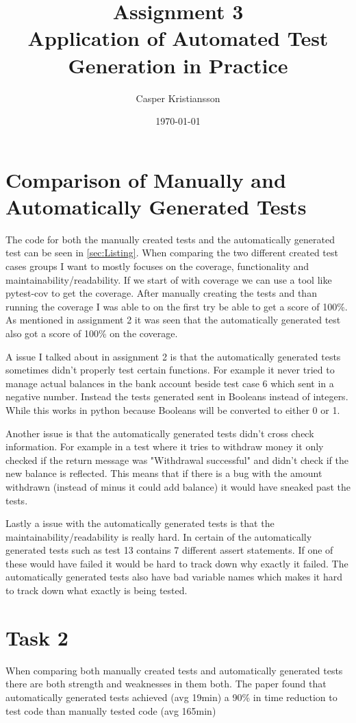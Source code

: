 \documentclass{article}
\title{Assignment 3\\Application of Automated Test Generation in Practice}
\author{Casper Kristiansson}
\date{\today}
\begin{document}
\maketitle

\section{Comparison of Manually and Automatically Generated Tests}
The code for both the manually created tests and the automatically generated test can be seen in \ref{sec:Listing}. When comparing the two different created test cases groups I want to mostly focuses on the coverage, functionality and maintainability/readability. If we start of with coverage we can use a tool like pytest-cov\cite{Welcomet80:online} to get the coverage. After manually creating the tests and than running the coverage I was able to on the first try be able to get a score of 100\%. As mentioned in assignment 2 it was seen that the automatically generated test also got a score of 100\% on the coverage.

A issue I talked about in assignment 2 is that the automatically generated tests sometimes didn't properly test certain functions. For example it never tried to manage actual balances in the bank account beside test case 6 which sent in a negative number. Instead the tests generated sent in Booleans instead of integers. While this works in python because Booleans will be converted to either 0 or 1.

Another issue is that the automatically generated tests didn't cross check information. For example in a test where it tries to withdraw money it only checked if the return message was "Withdrawal successful" and didn't check if the new balance is reflected. This means that if there is a bug with the amount withdrawn (instead of minus it could add balance) it would have sneaked past the tests.

Lastly a issue with the automatically generated tests is that the maintainability/readability is really hard. In certain of the automatically generated tests such as test 13 contains 7 different assert statements. If one of these would have failed it would be hard to track down why exactly it failed. The automatically generated tests also have bad variable names which makes it hard to track down what exactly is being tested.

\section{Task 2}
When comparing both manually created tests and automatically generated tests there are both strength and weaknesses in them both. The paper  \cite{enoiu2017comparative} found that automatically generated tests achieved (avg 19min) a 90\% in time reduction to test code than manually tested code (avg 165min)
\end{document}
